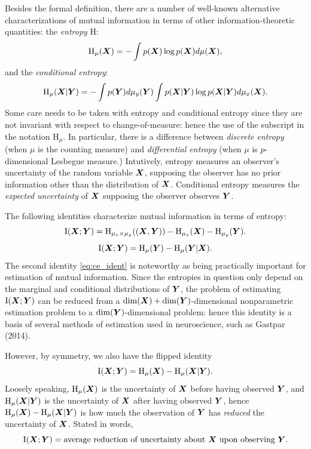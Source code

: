 Besides the formal definition, there are a number of well-known alternative
characterizations of mutual information in terms of other
information-theoretic quantities: the \emph{entropy} $\text{H}$:
\[
\text{H}_\mu(\boldsymbol{X}) = -\int p(\boldsymbol{X}) \log p(\boldsymbol{X}) d\mu(\boldsymbol{X}),
\]
and the \emph{conditional entropy}:
\[
\text{H}_\mu(\boldsymbol{X}|\boldsymbol{Y}) = -\int p(\boldsymbol{Y}) d\mu_y(\boldsymbol{Y}) \int p(\boldsymbol{X}|\boldsymbol{Y}) \log p(\boldsymbol{X}|\boldsymbol{Y}) d\mu_x(\boldsymbol{X}).
\]
Some care needs to be taken with entropy and conditional entropy since
they are not invariant with respect to change-of-measure: hence the
use of the subscript in the notation $\text{H}_\mu$.  In particular,
there is a difference between \emph{discrete entropy} (when $\mu$ is
the counting measure) and \emph{differential entropy} (when $\mu$ is
$p$-dimensional Lesbegue measure.)  Intutively, entropy measures an
observer's uncertainty of the random variable $\boldsymbol{X}$, supposing the
observer has no prior information other than the distribution of
$\boldsymbol{X}$. Conditional entropy measures the \emph{expected uncertainty} of
$\boldsymbol{X}$ supposing the observer observes $\boldsymbol{Y}$.

The following identities characterize mutual information in terms of entropy:
\[
\text{I}(\boldsymbol{X}; \boldsymbol{Y}) = \text{H}_{\mu_x \times \mu_y}((\boldsymbol{X}, \boldsymbol{Y})) - \text{H}_{\mu_x}(\boldsymbol{X}) - \text{H}_{\mu_y}(\boldsymbol{Y}).
\]
\begin{equation}\label{eq:ce_ident}
\text{I}(\boldsymbol{X}; \boldsymbol{Y}) = \text{H}_\mu(\boldsymbol{Y}) - \text{H}_\mu(\boldsymbol{Y}|\boldsymbol{X}).
\end{equation}
The second identity \eqref{eq:ce_ident} is noteworthy
as being practically important for estimation of mutual information.
Since the entropies in question only depend on the marginal and
conditional distributions of $\boldsymbol{Y}$, the problem of estimating
$\text{I}(\boldsymbol{X}; \boldsymbol{Y})$ can be reduced from a $\dim(\boldsymbol{X})
+ \dim(\boldsymbol{Y})$-dimensional nonparametric estimation problem to a
$\dim(\boldsymbol{Y})$-dimensional problem: hence this identity is a basis of
several methods of estimation used in neuroscience, such as Gastpar
(2014).

However, by symmetry, we also have the flipped identity
\begin{equation}\label{eq:ce_ident2}
\text{I}(\boldsymbol{X}; \boldsymbol{Y}) = \text{H}_\mu(\boldsymbol{X}) - \text{H}_\mu(\boldsymbol{X}|\boldsymbol{Y}).
\end{equation}
Loosely speaking, $\text{H}_\mu(\boldsymbol{X})$ is the uncertainty of $\boldsymbol{X}$
before having observed $\boldsymbol{Y}$, and $\text{H}_\mu(\boldsymbol{X}|\boldsymbol{Y})$ is the
uncertainty of $\boldsymbol{X}$ after having observed $\boldsymbol{Y}$, hence
$\text{H}_\mu(\boldsymbol{X}) - \text{H}_\mu(\boldsymbol{X}|\boldsymbol{Y})$ is how much the
observation of $\boldsymbol{Y}$ has \emph{reduced} the uncertainty of $\boldsymbol{X}$.
Stated in words,
\[
\text{I}(\boldsymbol{X}; \boldsymbol{Y}) = \text{average reduction of uncertainty about $\boldsymbol{X}$ upon observing $\boldsymbol{Y}$}.
\]


